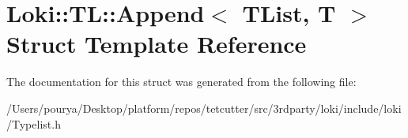 \hypertarget{structLoki_1_1TL_1_1Append}{}\section{Loki\+:\+:T\+L\+:\+:Append$<$ T\+List, T $>$ Struct Template Reference}
\label{structLoki_1_1TL_1_1Append}


The documentation for this struct was generated from the following file\+:\begin{DoxyCompactItemize}
\item 
/\+Users/pourya/\+Desktop/platform/repos/tetcutter/src/3rdparty/loki/include/loki/Typelist.\+h\end{DoxyCompactItemize}
